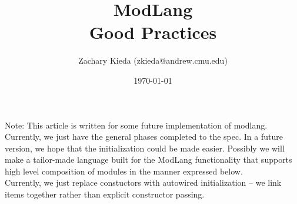 \documentclass[11pt]{article}
\begin{document}
\title{{ModLang}\\
{Good Practices}}
\author{Zachary Kieda (zkieda@andrew.cmu.edu)}
\date{\today}
\maketitle

Note: This article is written for some future implementation of modlang. Currently, we just have the general phases completed to the spec. In a future version, we hope that the initialization could be made easier. Possibly we will make a tailor-made language built for the ModLang functionality that supports high level composition of modules in the manner expressed below. \\

Currently, we just replace constuctors with autowired initialization -- we link items together rather than explicit constructor passing.

\begin{comment}
Idea : we could have modules be used for a new type of composition that's highly expressive.

Example: 

fn =  + : has 
   (_ * 3) (_ * 2)
 end : (_ / 10, _ mod 10)

fn(35) 
  = 
    + : has
      (_ * 3) (_ * 2)
    end : (3, 5)
  = 
    + : has
      9 10
    end
  = 19
  
We could then use this as a high-level composition of classes and their contents, as well as a broader version of function composition.
\end{comment}
\end{document}
